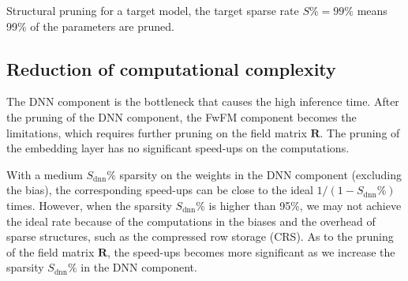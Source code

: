 \documentclass[sigconf]{acmart}
\begin{document}
\begin{algorithm}
\caption{Structural pruning for a target model, the target sparse rate $S\%=99\%$ means 99\% of the parameters are pruned.}\label{prune}
\begin{algorithmic}[1]




\end{algorithmic}
\end{algorithm}







\subsection{Reduction of computational complexity} 

The DNN component is the bottleneck that causes the high inference time. After the pruning of the DNN component, the FwFM component becomes the limitations, which requires further pruning on the field matrix $\bm{R}$. The pruning of the embedding layer has no significant speed-ups on the computations. 

With a medium $S_{\text{dnn}}\%$ sparsity on the weights in the DNN component (excluding the bias), the corresponding speed-ups can be close to the ideal $1/(1-S_{\text{dnn}}\%)$ times. However, when the sparsity $S_{\text{dnn}}\%$ is higher than 95\%, we may not achieve the ideal rate because of the computations in the biases and the overhead of sparse structures, such as the compressed row storage (CRS). As to the pruning of the field matrix $\bm{R}$, the speed-ups becomes more significant as we increase the sparsity $S_{\text{dnn}}\%$ in the DNN component. 
\end{document}
